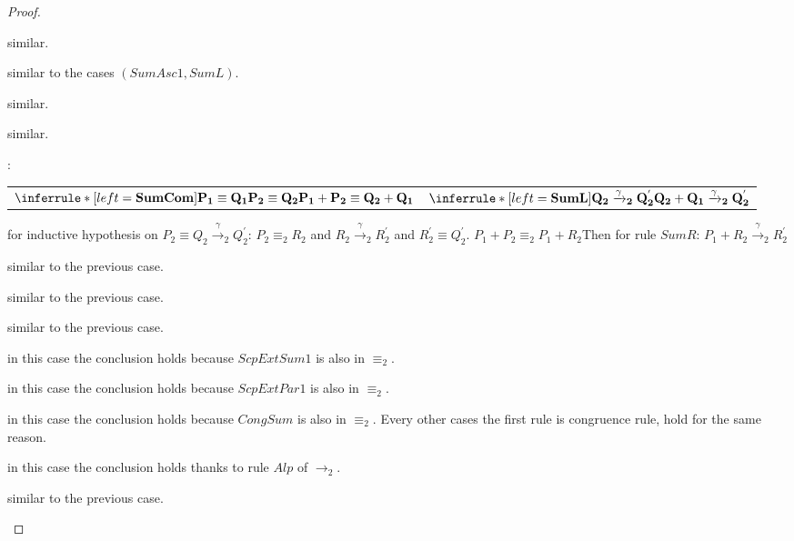 \begin{lemma}
\begin{proof}
\begin{description}
\begin{center}
	\end{center}
	similar.
      \item[$(SumAsc1, SumR)$] similar to the cases $(SumAsc1, SumL)$.
      \item[$(ParAsc1, ParL)$] similar.
      \item[$(ParAsc1, ParR)$] similar.
      \item[$(SumCom, SumL)$]:
	\begin{center}
	  \begin{tabular}{ll}
	      $$
	    &
	      $$
	  \end{tabular}
	\end{center}
	for inductive hypothesis on $P_{2}\equiv Q_{2} \xrightarrow{\gamma}_{2}Q_{2}^{'}$: $P_{2}\equiv_{2} R_{2}$ and $R_{2} \xrightarrow{\gamma}_{2} R_{2}^{'}$ and $R_{2}^{'} \equiv Q_{2}^{'}$. $P_{1}+P_{2} \equiv_{2} P_{1}+R_{2}$Then for rule $SumR$: $P_{1}+R_{2} \xrightarrow{\gamma}_{2} R_{2}^{'}$
      \item[$(SumCom, SumR)$] 
	similar to the previous case.
      \item[$(ParCom, ParL)$]
	similar to the previous case.
      \item[$(ParCom, ParR)$]
	similar to the previous case.
      \item[$(ScpExtSum1, \_)$] 
	in this case the conclusion holds because $ScpExtSum1$ is also in $\equiv_{2}$.
      \item[$(ScpExtPar1, \_)$]
	in this case the conclusion holds because $ScpExtPar1$ is also in $\equiv_{2}$.
      \item[$(CongSum, \_)$] 
	in this case the conclusion holds because $CongSum$ is also in $\equiv_{2}$. Every other cases the first rule is congruence rule, hold for the same reason.
      \item[$(Alp, \_)$] in this case the conclusion holds thanks to rule $Alp$ of $\rightarrow_{2}$.
      \item[$(Ide, Ide)$] similar to the previous case.

      \item[$(ParAsc1, EComL)$]
      \item[$(ParAsc1, EComR)$]
      \item[$(ParAsc1, ClsL)$]
      \item[$(ParAsc1, ClsR)$]
      \item[$(ParCom, EComL)$]
      \item[$(ParCom, EComR)$]
      \item[$(ParCom, ClsL)$]
      \item[$(ParCom, ClsR)$]
    \end{description}
  \end{proof}
\end{lemma}

